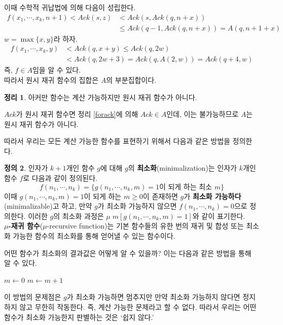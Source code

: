 \documentclass[b5paper, 10pt]{book}
\theoremstyle{definition}
\newtheorem{defn}{정의}[chapter]
\newtheorem{thm}[defn]{정리}
\newenvironment{pf*}{\pushQED{\qed}\pf}{\popQED\endpf}
\begin{document}
\begin{pf*}
    이때 수학적 귀납법에 의해 다음이 성립한다.
    \begin{align*}
        f(x_1, \cdots, x_k, n+1) < Ack(s, z) &< Ack(s, Ack(q, n+x)) \\ 
       &\le Ack(q-1, Ack(q, n+x)) = A(q, n+1+x)
    \end{align*}
    $w = \max\{x,y\}$라 하자. 
    \begin{align*}
        f(x_1, \cdots, x_k, y) &< Ack(q, x+y) \le Ack(q, 2w) \\ 
        &< Ack(q, 2w+3) = Ack(q, A(2,w)) = Ack(q+4, w) 
    \end{align*}
    즉, $f \in A$임을 알 수 있다. \\ 
    따라서 원시 재귀 함수의 집합은 $A$의 부분집합이다. 
\end{pf*}
\begin{thm}
    아커만 함수는 계산 가능하지만 원시 재귀 함수가 아니다. 
\end{thm}
\begin{pf*}
    $Ack$가 원시 재귀 함수면 정리 \ref{forack}에 의해 $Ack \in A$인데, 
    이는 불가능하므로 $A$는 원시 재귀 함수가 아니다. 
\end{pf*}
따라서 우리는 모든 계산 가능한 함수를 표현하기 위해서 다음과 같은 방법을 정의한다.
\begin{defn} \label{minimalization}
    인자가 $k+1$개인 함수 $g$에 대해 $g$의 \textbf{최소화}(minimalization)는
    인자가 $k$개인 함수 $f$로 다음과 같이 정의된다.
    $$f(n_1, \cdots, n_k) = \{g(n_1, \cdots, n_k, m) = 1\text{이 되게 하는 최소 } m\}$$
    이때 $g(n_1, \cdots, n_k, m) = 1$이 되게 하는 $m \ge 0$이 존재하면
    $g$가 \textbf{최소화 가능하다}(minimalizable)고 하고, 만약 
    $g$가 최소화 가능하지 않으면 $f(n_1, \cdots, n_k)=0$으로 정의한다. 
    이러한 $g$의 최소화 과정은 $\mu \; m[g(n_1, \cdots, n_k, m) = 1]$와 같이 표기한다. \\
    \textbf{$\mu$-재귀 함수}($\mu$-recursive function)는 기본 
    함수들의 유한 번의 재귀 및 합성 또는 최소화 가능한
    함수의 최소화를 통해 얻어낼 수 있는 함수이다. 
\end{defn}
어떤 함수가 최소화의 결과값은 어떻게 알 수 있을까? 이는 다음과 같은 방법을 통해 알 수 있다.
\begin{algorithmic}
        \State $m \gets 0$
            \State $m \gets m+1$
        \EndWhile
\end{algorithmic}
이 방법의 문제점은 $g$가 최소화 가능하면 멈추지만 만약 최소화 가능하지 않다면 정지하지 않고 무한히 작동한다.
즉, 계산 가능한 문제라고 할 수 없다. 따라서 우리는 어떤 함수가 최소화 가능한지 판별하는 것은 `쉽지 않다.'\\
\end{document}
